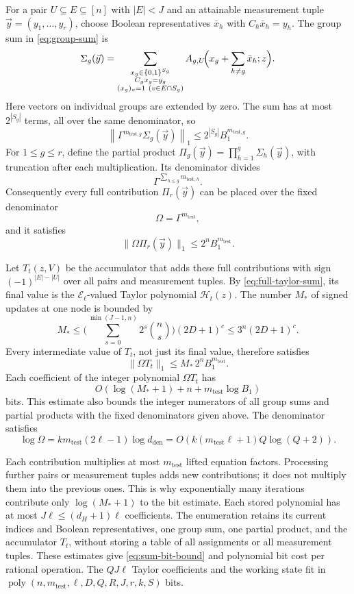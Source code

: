 \documentclass[11pt,reqno]{amsart}
\numberwithin{equation}{section}
\theoremstyle{definition}\newtheorem{definition}[theorem]{Definition}
\theoremstyle{remark}\newtheorem{remark}[theorem]{Remark}
\newcommand{\poly}{\operatorname{poly}}
\renewcommand{\le}{\leqslant}
\begin{document}
For a pair $U\subseteq E\subseteq[n]$ with $|E|<J$ and an attainable
measurement tuple $\vec y=(y_1,\ldots,y_r)$, choose Boolean representatives
$\bar x_h$ with $C_h\bar x_h=y_h$. The group sum in
\eqref{eq:group-sum} is
\[
 \Sigma_g(\vec y)=
 \sum_{\substack{x_g\in\{0,1\}^{S_g}\\ C_gx_g=y_g\\
                  (x_g)_v=1\ (v\in E\cap S_g)}}
 A_{g,U}\!\Bigl(x_g+\sum_{h\ne g}\bar x_h;z\Bigr).
\]
Here vectors on individual groups are extended by zero.
The sum has at most $2^{|S_g|}$ terms, all over the same denominator,
so
\[
 \left\|\Gamma^{m_{\mathrm{test},g}}\Sigma_g(\vec y)\right\|_1
 \le 2^{|S_g|}B_1^{m_{\mathrm{test},g}}.
\]
For $1\le g\le r$, define the partial product
$\Pi_g(\vec y)=\prod_{h=1}^g\Sigma_h(\vec y)$, with truncation after each
multiplication. Its denominator divides
\[
 \Gamma^{\sum_{h\le g}m_{\mathrm{test},h}}.
\]
Consequently every full contribution $\Pi_r(\vec y)$ can be placed over
the fixed denominator
\[
 \Omega=\Gamma^{m_{\mathrm{test}}},
\]
and it satisfies
\[
 \|\Omega\Pi_r(\vec y)\|_1
 \le2^nB_1^{m_{\mathrm{test}}}.
\]

Let $T_t(z,V)$ be the accumulator that adds these full
contributions with sign $(-1)^{|E|-|U|}$ over all pairs and measurement
tuples. By \eqref{eq:full-taylor-sum}, its final value is the
$\mathcal E_\ell$-valued Taylor polynomial $\mathcal H_t(z)$.
The number $M_*$ of signed updates at one node is bounded by
\[
 M_*\le
 \biggl(\sum_{s=0}^{\min(J-1,n)}2^s\binom ns\biggr)(2D+1)^c
 \le3^n(2D+1)^c.
\]
Every intermediate value of $T_t$, not just its final value,
therefore satisfies
\[
 \|\Omega T_t\|_1
 \le M_*\,2^nB_1^{m_{\mathrm{test}}}.
\]
Each coefficient of the integer polynomial $\Omega T_t$ has
\[
 O\!\left(\log(M_*+1)+n+m_{\mathrm{test}}\log B_1\right)
\]
bits. This estimate also bounds the integer numerators of all group
sums and partial products with the fixed denominators given above.
The denominator satisfies
\[
 \log\Omega
 =k m_{\mathrm{test}}(2\ell-1)\log d_{\mathrm{den}}
 =O\!\left(k(m_{\mathrm{test}}\ell+1)Q\log(Q+2)\right).
\]

Each contribution multiplies at most $m_{\mathrm{test}}$ lifted equation factors. Processing further pairs or measurement tuples adds
new contributions; it does not multiply them into the previous ones.
This is why exponentially many iterations contribute only
$\log(M_*+1)$ to the bit estimate. Each stored polynomial has at most
$J\ell\le(d_H+1)\ell$ coefficients. The enumeration retains its current
indices and Boolean representatives, one group sum, one partial
product, and the accumulator $T_t$, without storing a table of
all assignments or all measurement tuples. These estimates give
\eqref{eq:sum-bit-bound} and polynomial bit cost per rational operation.
The $QJ\ell$ Taylor coefficients and the working state fit in
$\poly(n,m_{\mathrm{test}},\ell,D,Q,R,J,r,k,S)$ bits.
\end{document}
